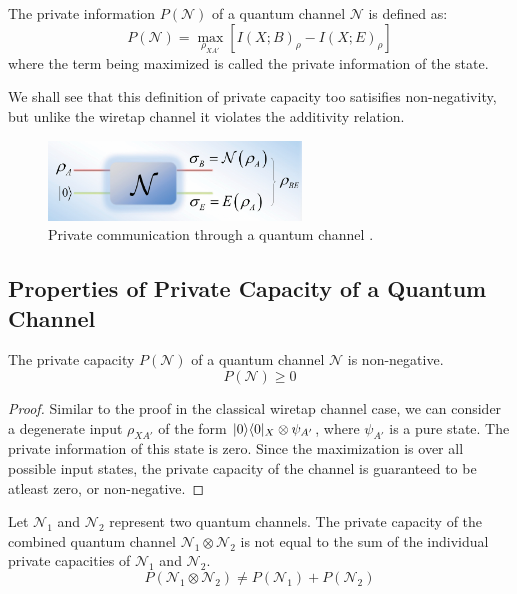 \begin{definition}
The private information $P(\mathcal{N})$ of a quantum channel $\mathcal{N}$ is defined as:
$$P(\mathcal{N}) = \max_{\rho_{XA'}} \left[ I(X;B)_\rho - I(X;E)_\rho \right]$$
where the term being maximized is called the private information of the state.
\end{definition}

We shall see that this definition of private capacity too satisifies non-negativity, but unlike the wiretap channel it violates the additivity relation.

\begin{figure}[H]
    \centering
    \includegraphics[width=0.6\textwidth]{figures/private_communication_quantum_channel.png}
    \caption{Private communication through a quantum channel \cite{Gyongyosi_2018}.}
\end{figure}

\subsection{Properties of Private Capacity of a Quantum Channel}

\begin{theorem}
The private capacity $P(\mathcal{N})$ of a quantum channel $\mathcal{N}$ is non-negative.
$$P(\mathcal{N}) \geq 0$$
\end{theorem}

\begin{proof}
Similar to the proof in the classical wiretap channel case, we can consider a degenerate input $\rho_{XA'}$ of the form $\lvert0\rangle\langle0\rvert_X \otimes \psi_{A'}$, where $\psi_{A'}$ is a pure state. The private information of this state is zero. Since the maximization is over all possible input states, the private capacity of the channel is guaranteed to be atleast zero, or non-negative.
\end{proof}

\begin{theorem}
Let $\mathcal{N}_1$ and $\mathcal{N}_2$ represent two quantum channels. The private capacity of the combined quantum channel $\mathcal{N}_1 \otimes \mathcal{N}_2$ is not equal to the sum of the individual private capacities of $\mathcal{N}_1$ and $\mathcal{N}_2$.
$$P(\mathcal{N}_1 \otimes \mathcal{N}_2) \neq P(\mathcal{N}_1) + P(\mathcal{N}_2)$$
\end{theorem}


